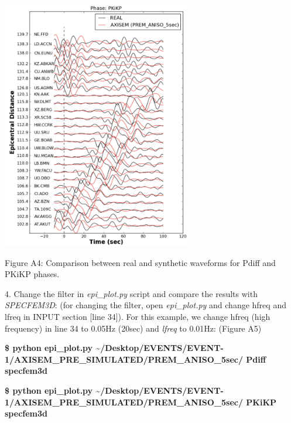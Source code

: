 \documentclass{article}
\begin{document}
\includegraphics[width=235pt, height=309pt, keepaspectratio=true]{AXISEMTutorial-fig009.pdf}

\begin{center}
{\small{}Figure A4: Comparison between real and synthetic waveforms for Pdiff and 
PKiKP phases.}
\end{center}

\baselineskip=13pt
\leftskip=0pt
4.  Change the filter in \textit{epi\_plot.py} script and compare the results with 
\textit{SPECFEM3D}: (for changing the filter, open \textit{epi\_plot.py }and change 
hfreq and lfreq in INPUT section [line 34]). For this example, we change hfreq 
(high frequency) in line 34 to 0.05Hz (20sec) and \textit{lfreq }to 0.01Hz: (Figure 
A5)

\textbf{\$ python epi\_plot.py \textasciitilde{}/Desktop/EVENTS/EVENT-1/AXISEM\_PRE\_SIMULATED/PREM\_ANISO\_5sec/ 
Pdiff specfem3d}

\textbf{\$ python epi\_plot.py \textasciitilde{}/Desktop/EVENTS/EVENT-1/AXISEM\_PRE\_SIMULATED/PREM\_ANISO\_5sec/ 
PKiKP specfem3d}
\end{document}
